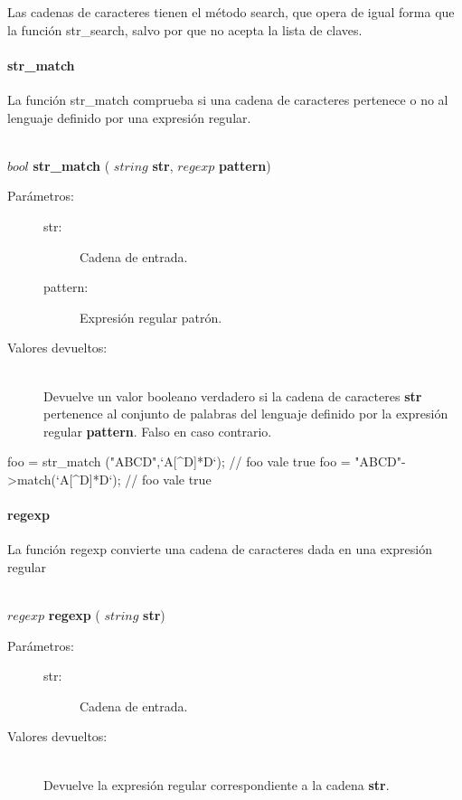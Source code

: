 Las cadenas de caracteres tienen el método search, que opera de igual forma que la
función str\_search, salvo por que no acepta la lista de claves.

\paragraph{str\_match}
La función str\_match comprueba si una cadena de caracteres pertenece o no al
lenguaje definido por una expresión regular.

\begin{framed}
\hfill \\ $bool$ \textbf{str\_match} ( $string$ \textbf{str}, $regexp$ \textbf{pattern})  
\begin{description}
\item [Parámetros:] \hfill 
   \begin{description}
   \item[str:] Cadena de entrada.
   \item[pattern:] Expresión regular patrón. 
   \end{description}
\item[Valores devueltos:] \hfill \\
   Devuelve un valor booleano verdadero si la cadena de caracteres \textbf{str} pertenence
   al conjunto de palabras del lenguaje definido por la expresión regular \textbf{pattern}. Falso
   en caso contrario.
\end{description}
\end{framed}

\begin{myverbatim}   
   foo = str_match ("ABCD",`A[^D]*D`); // foo vale true
   foo = "ABCD"->match(`A[^D]*D`); // foo vale true
\end{myverbatim}


\paragraph{regexp}
La función regexp convierte una cadena de caracteres dada en una expresión regular

\begin{framed}
\hfill \\ $regexp$ \textbf{regexp} ( $string$ \textbf{str})  
\begin{description}
\item [Parámetros:] \hfill 
   \begin{description}
   \item[str:] Cadena de entrada.
   \end{description}
\item[Valores devueltos:] \hfill \\
   Devuelve la expresión regular correspondiente a la cadena \textbf{str}.
\end{description}
\end{framed}

